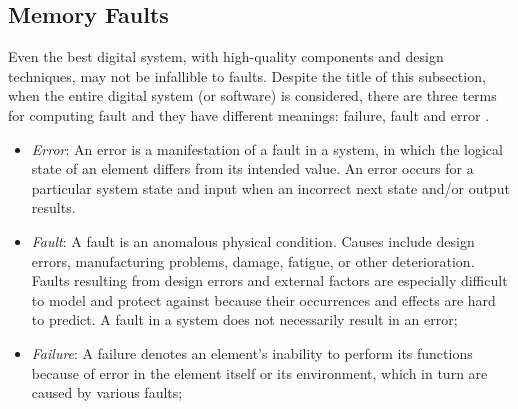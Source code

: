 \subsection{Memory Faults}

Even the best digital system, with high-quality components and design techniques, may not be infallible to faults. Despite the title of this subsection, when the entire digital system (or software) is considered, there are three terms for computing fault and they have different meanings: failure, fault and error \cite{Nelson1990}. 

\begin{itemize}
    \item \textit{Error}: An error is a manifestation of a fault in a system, in which the logical state of an element differs from its intended value. An error occurs for a particular system state and input when an incorrect next state and/or output results.
    \item \textit{Fault}: A fault is an anomalous physical condition. Causes include design errors, manufacturing problems, damage, fatigue, or other deterioration. Faults resulting from design errors and external factors are especially difficult to model and protect against because their occurrences and effects are hard to predict. A fault in a system does not necessarily result in an error;
    \item \textit{Failure}: A failure denotes an element's inability to perform its functions because of error in the element itself or its environment, which in turn are caused by various faults;
\end{itemize}